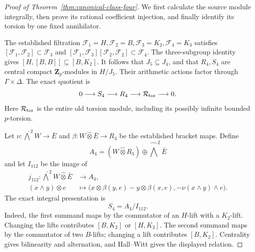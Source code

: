 \documentclass[11pt]{article}
\theoremstyle{definition}\newtheorem{definition}[theorem]{Definition}
\begin{document}
\begin{proof}[Proof of Theorem~\ref{thm:canonical-class-four}]
We first calculate the source module integrally, then
prove its rational coefficient injection, and finally
identify its torsion by one fixed annihilator.

The established filtration
$\mathcal F_1=H,\mathcal F_2=B,\mathcal F_3=K_2,\mathcal F_4=K_3$ satisfies
$[\mathcal F_1,\mathcal F_2]\subset \mathcal F_3$ and
$[\mathcal F_1,\mathcal F_3][\mathcal F_2,\mathcal F_2]\subset \mathcal F_4$.
The three-subgroup identity gives
$[H,[B,B]]\subseteq\overline{[B,K_2]}$.
It follows that $J_5\subseteq J_4$, and that $R_4,S_4$
are central compact $\mathbf Z_p$-modules in $H/J_5$.
Their arithmetic actions factor through
$\Gamma\times\Delta$. The exact quotient is
\begin{equation}\label{eq:class4-old-torsion}
 0\longrightarrow S_4\longrightarrow R_4
     \longrightarrow \mathcal R_{\rm tor}\longrightarrow0.
\end{equation}
Here $\mathcal R_{\rm tor}$ is the entire old torsion module,
including its possibly infinite bounded $p$-torsion.

Let $\nu:\widehat\bigwedge^2W\to\bar E$ and
$\beta:W\widehat\otimes\bar E\to R_3$ be the established
bracket maps. Define
\[
 A_4=(W\widehat\otimes R_3)\oplus
                          \widehat\bigwedge^2\bar E
\]
and let $I_{112}$ be the image of
\begin{align*}
 j_{112}:\widehat\bigwedge^2W\widehat\otimes\bar E
          &\longrightarrow A_4,\\
 (x\wedge y)\otimes e&\longmapsto
 \bigl(x\otimes\beta(y,e)-y\otimes\beta(x,e),
                         -\nu(x\wedge y)\wedge e\bigr).
\end{align*}
The exact integral presentation is
\begin{equation}\label{eq:class4-presentation}
                         S_4=A_4/I_{112}.
\end{equation}
Indeed, the first summand maps by the commutator of an
$H$-lift with a $K_2$-lift. Changing the lifts contributes
$[B,K_2]$ or $[H,K_3]$. The second summand maps by the
commutator of two $B$-lifts; changing a lift contributes
$[B,K_2]$. Centrality gives bilinearity and alternation,
and Hall--Witt gives the displayed relation.


\end{proof}
\end{document}
